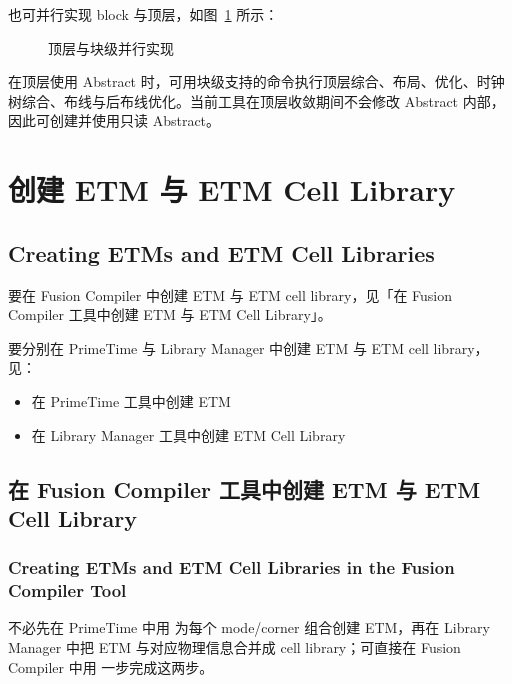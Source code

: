 也可并行实现 block 与顶层，如图~\ref{fig:hier-tlc-parallel} 所示：

\begin{figure}[htbp]
\centering
{}
\caption{顶层与块级并行实现}
\label{fig:hier-tlc-parallel}
\end{figure}

在顶层使用 Abstract 时，可用块级支持的命令执行顶层综合、布局、优化、时钟树综合、布线与后布线优化。当前工具在顶层收敛期间不会修改 Abstract 内部，因此可创建并使用只读 Abstract。

\section{创建 ETM 与 ETM Cell Library}
\subsection*{Creating ETMs and ETM Cell Libraries}

要在 Fusion Compiler 中创建 ETM 与 ETM cell library，见「在 Fusion Compiler 工具中创建 ETM 与 ETM Cell Library」。

要分别在 PrimeTime 与 Library Manager 中创建 ETM 与 ETM cell library，见：
\begin{itemize}
  \item 在 PrimeTime 工具中创建 ETM
  \item 在 Library Manager 工具中创建 ETM Cell Library
\end{itemize}

\subsection{在 Fusion Compiler 工具中创建 ETM 与 ETM Cell Library}
\subsubsection*{Creating ETMs and ETM Cell Libraries in the Fusion Compiler Tool}

不必先在 PrimeTime 中用  为每个 mode/corner 组合创建 ETM，再在 Library Manager 中把 ETM 与对应物理信息合并成 cell library；可直接在 Fusion Compiler 中用  一步完成这两步。


